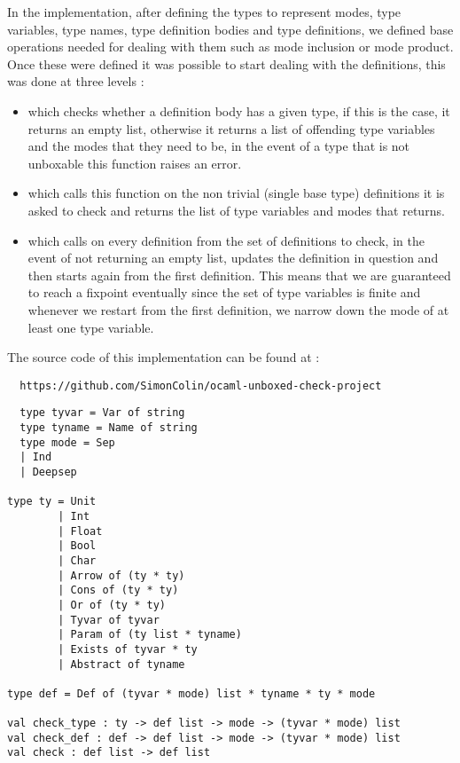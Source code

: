 \documentclass[a4]{article}
\begin{document}
In the implementation, after defining the types to represent modes, type variables, type names, type definition bodies and type definitions, we defined base operations needed for dealing with them such as mode inclusion or mode product. Once these were defined it was possible to start dealing with the definitions, this was done at three levels :
\begin{itemize}
\item {} which checks whether a definition body has a given type, if this is the case, it returns an empty list, otherwise it returns a list of offending type variables and the modes that they need to be, in the event of a type that is not unboxable this function raises an error.
\item {} which calls this function on the non trivial (single base type) definitions it is asked to check and returns the list of type variables and modes that  returns.
\item {} which calls  on every definition from the set of definitions to check, in the event of  not returning an empty list,  updates the definition in question and then starts again from the first definition. This means that we are guaranteed to reach a fixpoint eventually since the set of type variables is finite and whenever we restart from the first definition, we narrow down the mode of at least one type variable.
\end{itemize}

The source code of this implementation can be found at :
\begin{lstlisting}
  https://github.com/SimonColin/ocaml-unboxed-check-project
\end{lstlisting}

\begin{lstlisting}
  type tyvar = Var of string
  type tyname = Name of string
  type mode = Sep
  | Ind
  | Deepsep

type ty = Unit
        | Int
        | Float
        | Bool
        | Char
        | Arrow of (ty * ty)
        | Cons of (ty * ty)
        | Or of (ty * ty)
        | Tyvar of tyvar
        | Param of (ty list * tyname)
        | Exists of tyvar * ty
        | Abstract of tyname

type def = Def of (tyvar * mode) list * tyname * ty * mode

val check_type : ty -> def list -> mode -> (tyvar * mode) list
val check_def : def -> def list -> mode -> (tyvar * mode) list
val check : def list -> def list
\end{lstlisting}
\end{document}
